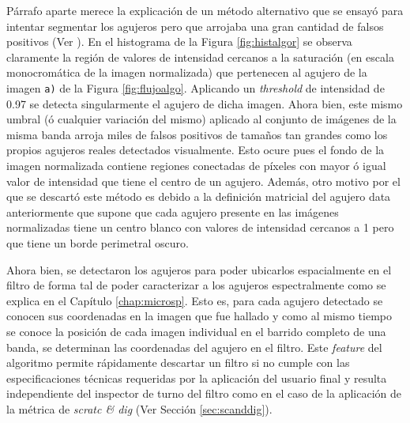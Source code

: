 \begin{enumerate}
\hspace{0.5cm}Párrafo aparte merece la explicación de un método alternativo que se ensayó para intentar segmentar los agujeros pero que arrojaba una gran cantidad de falsos positivos (Ver \href{https://github.com/jrr1984/defects_analysis/blob/master/MAIN/find_contours_holes_trial.py}{\faGithub}). En el histograma de la Figura \ref{fig:histalgor} se observa claramente la región de valores de intensidad cercanos a la saturación (en escala monocromática de la imagen normalizada) que pertenecen al agujero de la imagen \texttt{a)} de la Figura \ref{fig:flujoalgo}. Aplicando un \textit{threshold} de intensidad de 0.97 se detecta singularmente el agujero de dicha imagen. Ahora bien, este mismo umbral (ó cualquier variación del mismo) aplicado al conjunto de imágenes de la misma banda arroja miles de falsos positivos de tamaños tan grandes como los propios agujeros reales detectados visualmente. Esto ocure pues el fondo de la imagen normalizada contiene regiones conectadas de píxeles con mayor ó igual valor de intensidad que tiene el centro de un agujero. Además, otro motivo por el que se descartó este método es debido a la definición matricial del agujero data anteriormente que supone que cada agujero presente en las imágenes normalizadas tiene un centro blanco con valores de intensidad cercanos a 1 pero que tiene un borde perimetral oscuro.

\hspace{0.5cm}Ahora bien, se detectaron los agujeros para poder ubicarlos espacialmente en el filtro de forma tal de poder caracterizar a los agujeros espectralmente como se explica en el Capítulo \ref{chap:microsp}. Esto es, para cada agujero detectado se conocen sus coordenadas en la imagen que fue hallado y como al mismo tiempo se conoce la posición de cada imagen individual en el barrido completo de una banda, se determinan las coordenadas del agujero en el filtro. Este \textit{feature} del algoritmo permite rápidamente descartar un filtro si no cumple con las especificaciones técnicas requeridas por la aplicación del usuario final y resulta independiente del inspector de turno del filtro como en el caso de la aplicación de la métrica de \textit{scratc \& dig} (Ver Sección \ref{sec:scanddig}).


\end{enumerate}
